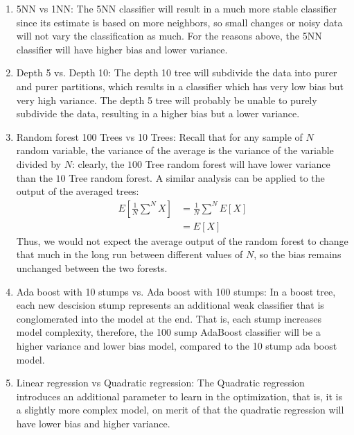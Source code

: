 \documentclass{article} %
\begin{document}
\begin{enumerate}
    a very unstable classifier, where even nearby points can be in
    completely different clusters. As such, we end up with a very
    high variance model, with bias that depends very heavily on the
    data, but will usually be somewhat low bias. The logistic
    regression will result in a much more stable, lower variance
    model, that will have a higher bias on the training set for the
    noisy labels.
  \item 5NN vs 1NN: The 5NN classifier will result in a much more
    stable classifier since its estimate is based on more neighbors,
    so small changes or noisy data will not vary the classification
    as much. For the reasons above, the 5NN classifier will have
    higher bias and lower variance.
  \item Depth 5 vs. Depth 10: The depth 10 tree will subdivide the
    data into purer and purer partitions, which results in a
    classifier which has very low bias but very high variance. The
    depth 5 tree will probably be unable to purely subdivide the
    data, resulting in a higher bias but a lower variance.
  \item Random forest 100 Trees vs 10 Trees: Recall that for any
    sample of $N$ random variable, the variance of the average is the
    variance of the variable divided by $N$: clearly, the $100$ Tree
    random forest will have lower variance than the $10$ Tree random
    forest. A similar analysis can be applied to the output of the
    averaged trees:
    \begin{align*}
      E[\frac{1}{N}\sum^{N} X] &= \frac{1}{N}\sum^{N} E[X] \\
      &= E[X]
    \end{align*}
    Thus, we would not expect the average output of the random forest
    to change that much in the long run between different values of
    $N$, so the bias remains unchanged between the two forests.
  \item Ada boost with 10 stumps vs. Ada boost with 100 stumps: In a
    boost tree, each new descision stump represents an additional
    weak classifier that is conglomerated into the model at the end.
    That is, each stump increases model complexity, therefore, the
    100 sump AdaBoost classifier will be a higher variance and lower
    bias model, compared to the 10 stump ada boost model.
  \item Linear regression vs Quadratic regression: The Quadratic
    regression introduces an additional parameter to learn in the
    optimization, that is, it is a slightly more complex model, on
    merit of that the quadratic regression will have lower bias and
    higher variance.
\end{enumerate}
\end{document}
